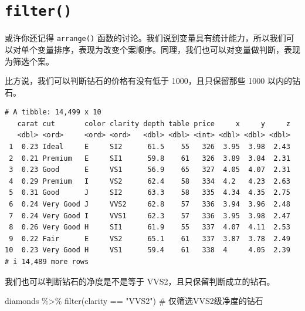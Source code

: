 \documentclass[
  letterpaper,
]{ctexbook}
\newenvironment{Shaded}{\begin{snugshade}}{\end{snugshade}}
\newcommand{\CommentTok}[1]{\textcolor[rgb]{0.37,0.37,0.37}{#1}}
\newcommand{\DecValTok}[1]{\textcolor[rgb]{0.68,0.00,0.00}{#1}}
\newcommand{\FunctionTok}[1]{\textcolor[rgb]{0.28,0.35,0.67}{#1}}
\newcommand{\NormalTok}[1]{\textcolor[rgb]{0.00,0.23,0.31}{#1}}
\newcommand{\SpecialCharTok}[1]{\textcolor[rgb]{0.37,0.37,0.37}{#1}}
\newcommand{\StringTok}[1]{\textcolor[rgb]{0.13,0.47,0.30}{#1}}
\begin{document}
\hypertarget{filter}{%
\section{\texorpdfstring{\texttt{filter()}}{filter()}}\label{filter}}

或许你还记得 \texttt{arrange()}
函数的讨论。我们说到变量具有统计能力，所以我们可以对单个变量排序，表现为改变个案顺序。同理，我们也可以对变量做判断，表现为筛选个案。

比方说，我们可以判断钻石的价格有没有低于 1000，且只保留那些 1000
以内的钻石。

\begin{Shaded}
\end{Shaded}

\begin{verbatim}
# A tibble: 14,499 x 10
   carat cut       color clarity depth table price     x     y     z
   <dbl> <ord>     <ord> <ord>   <dbl> <dbl> <int> <dbl> <dbl> <dbl>
 1  0.23 Ideal     E     SI2      61.5    55   326  3.95  3.98  2.43
 2  0.21 Premium   E     SI1      59.8    61   326  3.89  3.84  2.31
 3  0.23 Good      E     VS1      56.9    65   327  4.05  4.07  2.31
 4  0.29 Premium   I     VS2      62.4    58   334  4.2   4.23  2.63
 5  0.31 Good      J     SI2      63.3    58   335  4.34  4.35  2.75
 6  0.24 Very Good J     VVS2     62.8    57   336  3.94  3.96  2.48
 7  0.24 Very Good I     VVS1     62.3    57   336  3.95  3.98  2.47
 8  0.26 Very Good H     SI1      61.9    55   337  4.07  4.11  2.53
 9  0.22 Fair      E     VS2      65.1    61   337  3.87  3.78  2.49
10  0.23 Very Good H     VS1      59.4    61   338  4     4.05  2.39
# i 14,489 more rows
\end{verbatim}

我们也可以判断钻石的净度是不是等于 VVS2，且只保留判断成立的钻石。

\begin{Shaded}
\begin{Highlighting}[]
\NormalTok{diamonds }\SpecialCharTok{\%\textgreater{}\%}
  \FunctionTok{filter}\NormalTok{(clarity }\SpecialCharTok{==} \StringTok{"VVS2"}\NormalTok{) }\CommentTok{\# 仅筛选VVS2级净度的钻石}
\end{Highlighting}
\end{Shaded}
\end{document}
